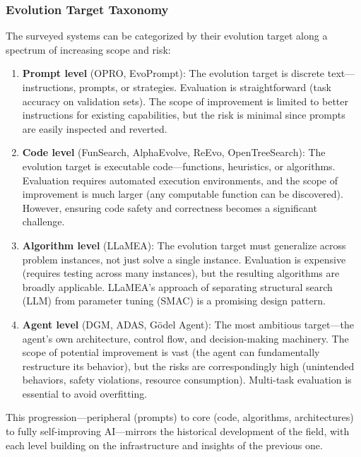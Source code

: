 \subsubsection{Evolution Target Taxonomy}

The surveyed systems can be categorized by their evolution target along a spectrum of increasing scope and risk:

\begin{enumerate}
    \item \textbf{Prompt level} (OPRO, EvoPrompt): The evolution target is discrete text---instructions, prompts, or strategies. Evaluation is straightforward (task accuracy on validation sets). The scope of improvement is limited to better instructions for existing capabilities, but the risk is minimal since prompts are easily inspected and reverted.

    \item \textbf{Code level} (FunSearch, AlphaEvolve, ReEvo, OpenTreeSearch): The evolution target is executable code---functions, heuristics, or algorithms. Evaluation requires automated execution environments, and the scope of improvement is much larger (any computable function can be discovered). However, ensuring code safety and correctness becomes a significant challenge.

    \item \textbf{Algorithm level} (LLaMEA): The evolution target must generalize across problem instances, not just solve a single instance. Evaluation is expensive (requires testing across many instances), but the resulting algorithms are broadly applicable. LLaMEA's approach of separating structural search (LLM) from parameter tuning (SMAC) is a promising design pattern.

    \item \textbf{Agent level} (DGM, ADAS, G\"{o}del Agent): The most ambitious target---the agent's own architecture, control flow, and decision-making machinery. The scope of potential improvement is vast (the agent can fundamentally restructure its behavior), but the risks are correspondingly high (unintended behaviors, safety violations, resource consumption). Multi-task evaluation is essential to avoid overfitting.
\end{enumerate}

This progression---peripheral (prompts) to core (code, algorithms, architectures) to fully self-improving AI---mirrors the historical development of the field, with each level building on the infrastructure and insights of the previous one.


